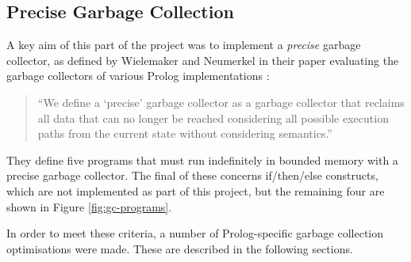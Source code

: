 \subsection{Precise Garbage Collection}

\label{sec:precise-gc}

A key aim of this part of the project was to implement a \emph{precise} garbage collector, as defined by Wielemaker and Neumerkel in their paper evaluating the garbage collectors of various Prolog implementations \cite{wielemakerPreciseGarbageCollection2008}:

\begin{quote}
``We define a `precise' garbage collector as a garbage collector that reclaims all data that can no longer be reached considering all possible execution paths from the current state without considering semantics.''
\end{quote}

They define five programs that must run indefinitely in bounded memory with a precise garbage collector. The final of these concerns if/then/else constructs, which are not implemented as part of this project, but the remaining four are shown in Figure \ref{fig:gc-programs}.

In order to meet these criteria, a number of Prolog-specific garbage collection optimisations were made. These are described in the following sections.

